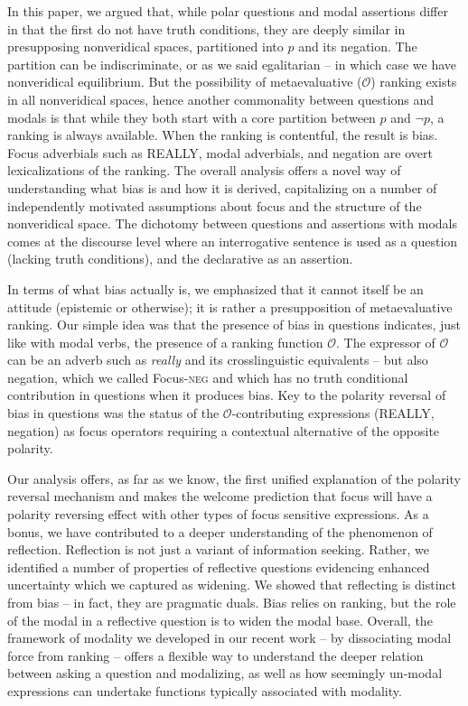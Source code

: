 \documentclass[output=paper,colorlinks,citecolor=brown]{langscibook}
\begin{document}
In this paper, we argued that, while polar questions and modal assertions differ in that the first do not have truth conditions, they are deeply similar in  presupposing nonveridical spaces, partitioned into $p$ and its negation. The partition can be indiscriminate, or as we said egalitarian --  in which case we have nonveridical equilibrium. But  the possibility of metaevaluative ($\mathcal{O}$) ranking exists in all nonveridical spaces, hence another commonality between questions and modals  is that while they both start with a core partition between $p$ and $\neg p$, a ranking is always available. When the ranking is contentful, the result is bias.  Focus adverbials such as \textsc{REALLY}, modal adverbials, and negation are overt lexicalizations of the ranking.  The overall analysis offers a novel way of understanding what bias is and how it is derived, capitalizing on a number of independently motivated assumptions about focus and the structure of the nonveridical space. The dichotomy between questions and assertions with modals comes at the discourse level where an interrogative sentence is used as a question (lacking truth conditions), and the declarative as an assertion.

 In terms of what bias actually is, we emphasized that it cannot itself be an attitude (epistemic or otherwise); it is rather a presupposition of metaevaluative ranking.  Our simple idea was that the presence of bias in questions indicates, just like with modal verbs, the presence of a ranking function $\mathcal{O}$. The expressor of $\mathcal{O}$ can be an adverb such as \textit{really} and its crosslinguistic equivalents --  but also negation, which we called Focus-\textsc{neg} and which has no truth conditional contribution in questions when it produces bias. Key to the polarity reversal of bias in questions was the status of the $\mathcal{O}$-contributing expressions (\textsc{REALLY}, negation) as focus operators requiring a contextual alternative of the opposite polarity.
 
 Our analysis  offers, as far as we know, the first unified explanation of the polarity reversal mechanism and makes the welcome prediction that focus will have a polarity reversing effect with other types of focus sensitive expressions.   As a bonus, we have contributed to a deeper understanding of the phenomenon of reflection. Reflection is not just a variant of information seeking. Rather, we identified a number of properties of reflective questions evidencing enhanced uncertainty which we captured as widening.  We showed that reflecting is distinct from bias --  in fact, they are pragmatic duals. Bias relies on ranking, but the role of the modal in a reflective question is to widen the modal base. Overall, the framework of modality we developed in our recent work   --  by dissociating modal force from ranking --  offers a flexible way to understand the deeper relation between asking a question and modalizing, as well as how seemingly un-modal expressions can undertake functions typically associated with modality.
 
\end{document}
